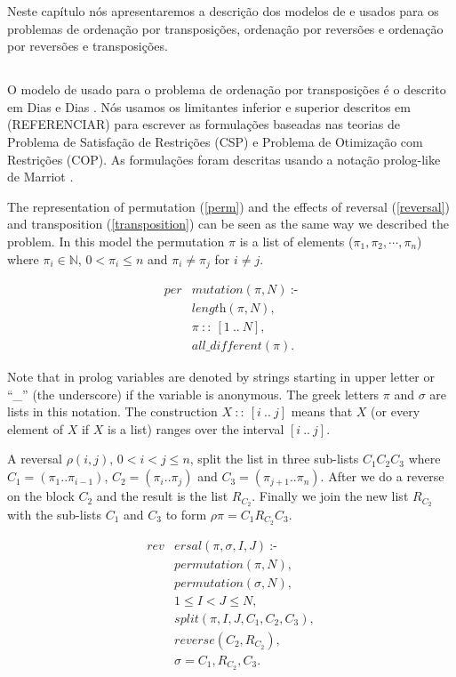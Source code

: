 Neste capítulo nós apresentaremos a descrição dos modelos de \pr{} e
\pli{} usados para os problemas de ordenação por transposições,
ordenação por reversões e ordenação por reversões e transposições.

\subsection{\PR}
\label{subsec:cp}
O modelo de \pr{} usado para o problema de ordenação por transposições é
o descrito em Dias e Dias \cite{DiasDias*2009}. Nós usamos os
limitantes inferior e superior descritos em (REFERENCIAR) para
escrever as formulações baseadas nas teorias de Problema de Satisfação
de Restrições (CSP) e Problema de Otimização com Restrições (COP). As
formulações foram descritas usando a notação prolog-like de
Marriot \cite{Marriott*1998}.

The representation of permutation (\ref{perm}) and the effects of
reversal (\ref{reversal}) and transposition (\ref{transposition}) can
be seen as the same way we described the problem. In this model the
permutation $\pi$ is a list of elements
($\pi_{1},\pi_{2},\cdots,\pi_{n}$) where $\pi_{i} \in \mathbb{N}$, $0
< \pi_{i} \le n$ and $\pi_{i} \neq \pi_{j}$ for $i \neq j$.

\begin{align}
  \label{perm}
  \textit{per}&\textit{mutation}(\pi, N)~\text{:-} \nonumber\\
  &\textit{length}(\pi, N), \\ 
  &\pi~::~[1~..~N], \nonumber\\
  &\textit{all\_different}(\pi). \nonumber
\end{align}

Note that in prolog variables are denoted by strings starting in upper
letter or ``\_'' (the underscore) if the variable is anonymous. The
greek letters $\pi$ and $\sigma$ are lists in this notation. The
construction $X~::~[i~..~j]$ means that $X$ (or every element of $X$
if $X$ is a list) ranges over the interval $[i~..~j]$.

A reversal $\rho(i,j)$, $0 < i < j \leq n$, split the list in three
sub-lists $C_{1}C_{2}C_{3}$ where $C_{1} = (\pi_{1} .. \pi_{i-1})$,
$C_{2} = (\pi_{i} .. \pi_{j})$ and $C_{3} = (\pi_{j+1} .. \pi_{n})$.
After we do a reverse on the block $C_{2}$ and the result is the list
$R_{C_{2}}$. Finally we join the new list $R_{C_{2}}$ with the
sub-lists $C_{1}$ and $C_{3}$ to form $\rho\pi = C_{1}R_{C_{2}}C_{3}$.

\begin{align}
  \label{reversal}
  \textit{rev}&\textit{ersal}(\pi, \sigma, I, J)~\text{:-} \nonumber\\
  &\textit{permutation}(\pi, N), \nonumber\\
  &\textit{permutation}(\sigma, N), \nonumber \\
  &1 \le I < J \le N, \\
  &\textit{split}(\pi, I, J, C_{1}, C_{2}, C_{3}), \nonumber\\
  &\textit{reverse}(C_{2}, R_{C_{2}}), \nonumber \\
  &\sigma = C_{1}, R_{C_{2}}, C_{3}. \nonumber
\end{align}


